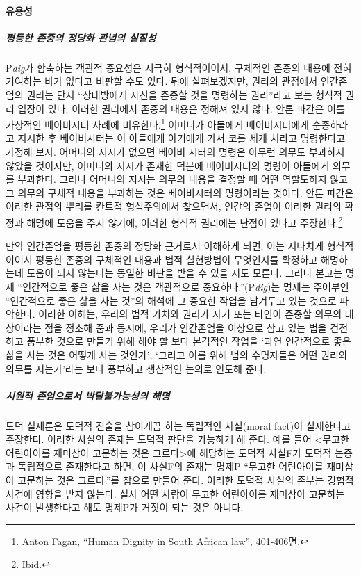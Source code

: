 \paragraph{유용성}

\subparagraph{평등한 존중의 정당화 관념의 실질성}

P\emph{dig}가 함축하는 객관적 중요성은 지극히 형식적이어서, 구체적인 존중의 내용에 전혀 기여하는 바가 없다고 비판할 수도 있다. 뒤에 살펴보겠지만, 권리의 관점에서 인간존엄의 권리는 단지 ``상대방에게 자신을 존중할 것을 명령하는 권리''라고 보는 형식적 권리 입장이 있다. 이러한 권리에서 존중의 내용은 정해져 있지 않다. 안톤 파간은 이를 가상적인 베이비시터 사례에 비유한다.\footnote{Anton Fagan, ``Human Dignity in South African law'', 401-406면.} 어머니가 아들에게 베이비시터에게 순종하라고 지시한 후 베이비시터는 이 아들에게 아기에게 가서 코를 세게 치라고 명령한다고 가정해 보자. 어머니의 지시가 없으면 베이비 시터의 명령은 아무런 의무도 부과하지 않았을 것이지만, 어머니의 지시가 존재한 덕분에 베이비시터의 명령이 아들에게 의무를 부과한다. 그러나 어머니의 지시는 의무의 내용을 결정할 때 어떤 역할도하지 않고 그 의무의 구체적 내용을 부과하는 것은 베이비시터의 명령이라는 것이다. 안톤 파간은 이러한 관점의 뿌리를 칸트적 형식주의에서 찾으면서, 인간의 존엄이 이러한 권리의 확정과 해명에 도움을 주지 않기에, 이러한 형식적 권리에는 난점이 있다고 주장한다.\footnote{Ibid.}

만약 인간존엄을 평등한 존중의 정당화 근거로서 이해하게 되면, 이는 지나치게 형식적이어서 평등한 존중의 구체적인 내용과 법적 실현방법이 무엇인지를 확정하고 해명하는데 도움이 되지 않는다는 동일한 비판을 받을 수 있을 지도 모른다. 그러나 본고는 명제 ``인간적으로 좋은 삶을 사는 것은 객관적으로 중요하다.''(P\emph{dig})는 명제는 주어부인 ``인간적으로 좋은 삶을 사는 것''의 해석에 그 중요한 작업을 남겨두고 있는 것으로 파악한다. 이러한 이해는, 우리의 법적 가치와 권리가 자기 또는 타인이 존중할 의무의 대상이라는 점을 정초해 줌과 동시에, 우리가 인간존엄을 이상으로 삼고 있는 법을 건전하고 풍부한 것으로 만들기 위해 해야 할 보다 본격적인 작업을 `과연 인간적으로 좋은 삶을 사는 것은 어떻게 사는 것인가', `그리고 이를 위해 법의 수명자들은 어떤 권리와 의무를 지는가'라는 보다 풍부하고 생산적인 논의로 인도해 준다.

\subparagraph{시원적 존엄으로서 박탈불가능성의 해명}

도덕 실재론은 도덕적 진술을 참이게끔 하는 독립적인 사실(moral fact)이 실재한다고 주장한다. 이러한 사실의 존재는 도덕적 판단을 가능하게 해 준다. 예를 들어 \textless 무고한 어린아이를 재미삼아 고문하는 것은 그르다\textgreater 에 해당하는 도덕적 사실F가 도덕적 논증과 독립적으로 존재한다고 하면, 이 사실F의 존재는 명제P ``무고한 어린아이를 재미삼아 고문하는 것은 그르다.''를 참으로 만들어 준다. 이러한 도덕적 사실의 존부는 경험적 사건에 영향을 받지 않는다. 설사 어떤 사람이 무고한 어린아이를 재미삼아 고문하는 사건이 발생한다고 해도 명제P가 거짓이 되는 것은 아니다.

